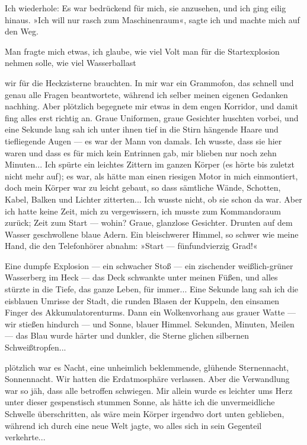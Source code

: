 Ich wiederhole: Es war bedrückend für mich, sie anzusehen, und ich
ging eilig hinaus. »Ich will nur rasch zum Maschinenraum«, sagte
ich und machte mich auf den Weg.

Man fragte mich etwas, ich glaube, wie viel Volt man für die
Startexplosion nehmen solle, wie viel Wasserballast

wir für die Heckzisterne brauchten. In mir war ein Grammofon, das
schnell und genau alle Fragen beantwortete, während ich selber
meinen eigenen Gedanken nachhing. Aber plötzlich begegnete mir
etwas in dem engen Korridor, und damit fing alles erst richtig an.
Graue Uniformen, graue Gesichter huschten vorbei, und eine Sekunde
lang sah ich unter ihnen tief in die Stirn hängende Haare und
tiefliegende Augen — es war der Mann von damals. Ich wusste, dass
sie hier waren und dass es für mich kein Entrinnen gab, mir blieben
nur noch zehn Minuten... Ich spürte ein leichtes Zittern im ganzen
Körper (es hörte bis zuletzt nicht mehr auf); es war, als hätte man
einen riesigen Motor in mich einmontiert, doch mein Körper war zu
leicht gebaut, so dass sämtliche Wände, Schotten, Kabel, Balken und
Lichter zitterten... Ich wusste nicht, ob sie schon da war. Aber
ich hatte keine Zeit, mich zu vergewissern, ich musste zum
Kommandoraum zurück; Zeit zum Start — wohin? Graue, glanzlose
Gesichter. Drunten auf dem Wasser geschwollene blaue Adern. Ein
bleischwerer Himmel, so schwer wie meine Hand, die den Telefonhörer
abnahm: »Start — fünfundvierzig Grad!«

Eine dumpfe Explosion — ein schwacher Stoß — ein zischender
weißlich-grüner Wasserberg im Heck — das Deck schwankte unter
meinen Füßen, und alles stürzte in die Tiefe, das ganze Leben, für
immer... Eine Sekunde lang sah ich die eisblauen Umrisse der Stadt,
die runden Blasen der Kuppeln, den einsamen Finger des
Akkumulatorenturms. Dann ein Wolkenvorhang aus grauer Watte — wir
stießen hindurch — und Sonne, blauer Himmel. Sekunden, Minuten,
Meilen — das Blau wurde härter und dunkler, die Sterne glichen
silbernen Schweißtropfen...

plötzlich war es Nacht, eine unheimlich beklemmende, glühende
Sternennacht, Sonnennacht. Wir hatten die Erdatmosphäre verlassen.
Aber die Verwandlung war so jäh, dass alle betroffen schwiegen. Mir
allein wurde es leichter ums Herz unter dieser gespenstisch stummen
Sonne, als hätte ich die unvermeidliche Schwelle überschritten, als
wäre mein Körper irgendwo dort unten geblieben, während ich durch
eine neue Welt jagte, wo alles sich in sein Gegenteil verkehrte...

